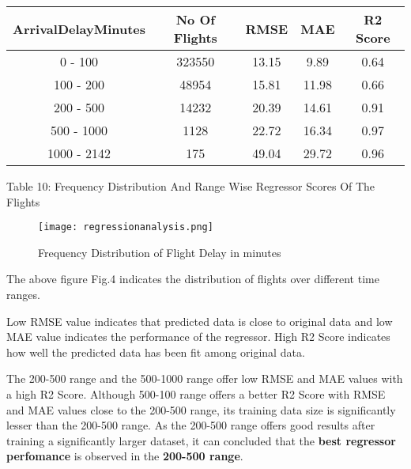\documentclass[12pt,letter-paper]{article}
\begin{document}
    \begin{table}[H]
        \begin{center}
            \begin{tabular}{ |c|c|c|c|c| } 
                \hline
                ArrivalDelayMinutes & No Of Flights & RMSE & MAE & R2 Score\\ 
                \hline
                0 - 100 & 323550 & 13.15 & 9.89 & 0.64\\ 
                \hline
                100 - 200 & 48954 & 15.81 & 11.98 & 0.66\\ 
                \hline
                200 - 500 & 14232 & 20.39 & 14.61 & 0.91\\ 
                \hline
                500 - 1000 & 1128 & 22.72 & 16.34 & 0.97\\ 
                \hline
                1000 - 2142 & 175 & 49.04 & 29.72 & 0.96\\ 
                \hline
        \end{tabular}
        \end{center}
        \begin{center}
            Table 10: Frequency Distribution And Range Wise Regressor Scores Of The Flights
    \end{center}
    \end{table}
    
    \begin{figure}[H]%
        \begin{center}
            \texttt{[image: regressionanalysis.png]}%
                \caption{Frequency Distribution of Flight Delay in minutes}  
        \end{center}
    \end{figure}
    
    The above figure Fig.4 indicates the distribution of flights over different time ranges. 
    
    Low RMSE value indicates that predicted data is close to original data and low MAE value indicates the performance of the regressor. High R2 Score indicates how well the predicted data has been fit among original data.
    
    The 200-500 range and the 500-1000 range offer low RMSE and MAE values with a high R2 Score. Although 500-100 range offers a better R2 Score with RMSE and MAE values close to the 200-500 range, its training data size is significantly lesser than the 200-500 range. As the 200-500 range offers good results after training a significantly larger dataset, it can concluded that the {\bfseries best regressor perfomance} is observed in the {\bfseries 200-500 range}. 
    
\end{document}
